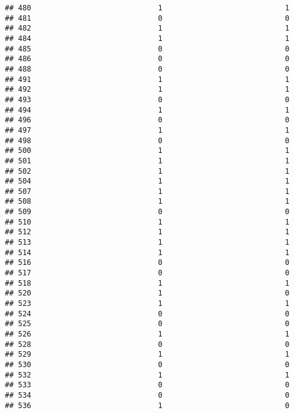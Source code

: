 \documentclass[
]{article}
\begin{document}
\begin{verbatim}
## 480                             1                            1
## 481                             0                            0
## 482                             1                            1
## 484                             1                            1
## 485                             0                            0
## 486                             0                            0
## 488                             0                            0
## 491                             1                            1
## 492                             1                            1
## 493                             0                            0
## 494                             1                            1
## 496                             0                            0
## 497                             1                            1
## 498                             0                            0
## 500                             1                            1
## 501                             1                            1
## 502                             1                            1
## 504                             1                            1
## 507                             1                            1
## 508                             1                            1
## 509                             0                            0
## 510                             1                            1
## 512                             1                            1
## 513                             1                            1
## 514                             1                            1
## 516                             0                            0
## 517                             0                            0
## 518                             1                            1
## 520                             1                            0
## 523                             1                            1
## 524                             0                            0
## 525                             0                            0
## 526                             1                            1
## 528                             0                            0
## 529                             1                            1
## 530                             0                            0
## 532                             1                            1
## 533                             0                            0
## 534                             0                            0
## 536                             1                            0

\end{verbatim}
\end{document}
